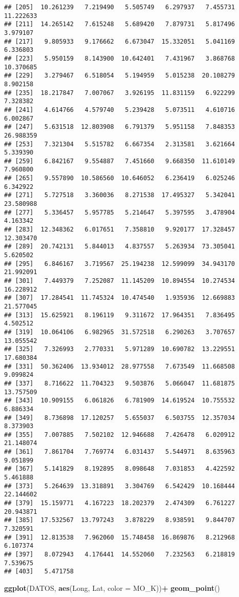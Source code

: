\documentclass[
]{article}
\newenvironment{Shaded}{\begin{snugshade}}{\end{snugshade}}
\newcommand{\DataTypeTok}[1]{\textcolor[rgb]{0.13,0.29,0.53}{#1}}
\newcommand{\KeywordTok}[1]{\textcolor[rgb]{0.13,0.29,0.53}{\textbf{#1}}}
\newcommand{\NormalTok}[1]{#1}
\newcommand{\OperatorTok}[1]{\textcolor[rgb]{0.81,0.36,0.00}{\textbf{#1}}}
\newcommand{\StringTok}[1]{\textcolor[rgb]{0.31,0.60,0.02}{#1}}
\begin{document}
\begin{verbatim}
## [205]  10.261239   7.219490   5.505749   6.297937   7.455731  11.222633
## [211]  14.265142   7.615248   5.689420   7.879731   5.817496   3.979107
## [217]   9.805933   9.176662   6.673047  15.332051   5.041169   6.336803
## [223]   5.950159   8.143900  10.642401   7.431967   3.868768  10.370685
## [229]   3.279467   6.518054   5.194959   5.015238  20.108279   8.902158
## [235]  18.217847   7.007067   3.926195  11.831159   6.922299   7.328382
## [241]   4.614766   4.579740   5.239428   5.073511   4.610716   6.002867
## [247]   5.631518  12.803908   6.791379   5.951158   7.848353  26.988359
## [253]   7.321304   5.515782   6.667354   2.313581   3.621664   5.339390
## [259]   6.842167   9.554887   7.451660   9.668350  11.610149   7.960800
## [265]   9.557890  10.586560  10.646052   6.236419   6.025246   6.342922
## [271]   5.727518   3.360036   8.271538  17.495327   5.342041  23.580988
## [277]   5.336457   5.957785   5.214647   5.397595   3.478904   4.163342
## [283]  12.348362   6.017651   7.358810   9.920177  17.328457  12.303470
## [289]  20.742131   5.844013   4.837557   5.263934  73.305041   5.620502
## [295]   6.846167   3.719567  25.194238  12.599099  34.943170  21.992091
## [301]   7.449379   7.252087  11.145209  10.894554  10.274534  16.228912
## [307]  17.284541  11.745324  10.474540   1.935936  12.669883  21.577045
## [313]  15.625921   8.196119   9.311672  17.964351   7.836495   4.502512
## [319]  10.064106   6.982965  31.572518   6.290263   3.707657  13.055542
## [325]   7.326993   2.770331   5.971289  10.690782  13.229551  17.680384
## [331]  50.362406  13.934012  28.977558   7.673549  11.668508   9.099824
## [337]   8.716622  11.704323   9.503876   5.066047  11.681875  13.757509
## [343]  10.909155   6.061826   6.781909  14.619524  10.755532   6.886334
## [349]   8.736898  17.120257   5.655037   6.503755  12.357034   8.373903
## [355]   7.007885   7.502102  12.946688   7.426478   6.020912  21.148074
## [361]   7.861704   7.769774   6.031437   5.544971   8.635963   9.051899
## [367]   5.141829   8.192895   8.098648   7.031853   4.422592   5.461888
## [373]   5.264639  13.318891   3.304769   6.542429  10.168444  22.144602
## [379]  15.159771   4.167223  18.202379   2.474309   6.761227  20.943871
## [385]  17.532567  13.797243   3.878229   8.938591   9.844707   7.320591
## [391]  12.813538   7.962060  15.748458  16.869876   8.212968   6.107374
## [397]   8.072943   4.176441  14.552060   7.232563   6.218819   7.539675
## [403]   5.471758
\end{verbatim}

\begin{Shaded}
\begin{Highlighting}[]
\KeywordTok{ggplot}\NormalTok{(DATOS, }\KeywordTok{aes}\NormalTok{(Long, Lat, }\DataTypeTok{color =}\NormalTok{ MO_K))}\OperatorTok{+}
\StringTok{  }\KeywordTok{geom_point}\NormalTok{()}
\end{Highlighting}
\end{Shaded}
\end{document}
